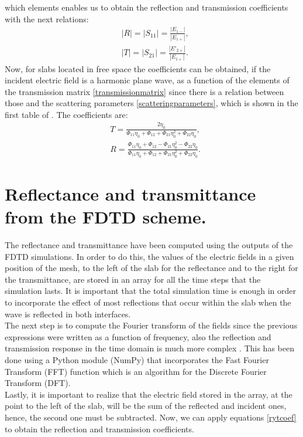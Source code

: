 \documentclass[12pt, oneside]{book}
\begin{document}
which elements enables us to obtain the reflection and transmission coefficients with the next relations:
\begin{equation}
\begin{aligned}\label{rytcoef}
&|R|=\left|S_{11}\right|=\frac{\left|E_{1-}\right|}{\left|E_{1+}\right|}, \\
&|T|=\left|S_{21}\right|=\frac{\left|E'_{2+}\right|}{\left|E_{1+}\right|}.
\end{aligned}
\end{equation}
\indent Now, for slabs located in free space the coefficients can be obtained, if the incident electric field is a harmonic plane wave, as a function of the elements of the transmission matrix \ref{transmissionmatrix} since there is a relation between those and the scattering parameters \ref{scatteringparameters}, which is shown in the first table of \cite{frickey1994conversions}. The coefficients are:
\begin{equation}\label{analyticresultrt}
\begin{aligned}
&T=\frac{2 \eta_{0}}{\Phi_{11} \eta_{0}+\Phi_{12}+\Phi_{21} \eta_{0}^{2}+\Phi_{22} \eta_{0}}, \\
&R=\frac{\Phi_{11} \eta_{0}+\Phi_{12}-\Phi_{21} \eta_{0}^{2}-\Phi_{22} \eta_{0}}{\Phi_{11} \eta_{0}+\Phi_{12}+\Phi_{21} \eta_{0}^{2}+\Phi_{22} \eta_{0}}.
\end{aligned} 
\end{equation} 

\section{Reflectance and transmittance from the FDTD scheme.}\label{rytfromthesfdtdscheme}
The reflectance and transmittance have been computed using the outputs of the FDTD simulations. In order to do this, the values of the electric fields in a given position of the mesh, to the left of the slab for the reflectance and to the right for the transmittance, are stored in an array for all the time steps that the simulation lasts. It is important that the total simulation time is enough in order to incorporate the effect of most reflections that occur within the slab when the wave is reflected in both interfaces. \\
\indent The next step is to compute the Fourier transform of the fields since the previous expressions were written as a function of frequency, also the reflection and transmission response in the time domain is much more complex \cite{orfanidis2002electromagnetic}. This has been done using a Python module (NumPy) that incorporates the Fast Fourier Transform (FFT) function which is an algorithm for the Discrete Fourier Transform (DFT). \\
\indent Lastly, it is important to realize that the electric field stored in the array, at the point to the left of the slab, will be the sum of the reflected and incident ones, hence, the second one must be subtracted. Now, we can apply equations \ref{rytcoef} to obtain the reflection and transmission coefficients.
\end{document}
